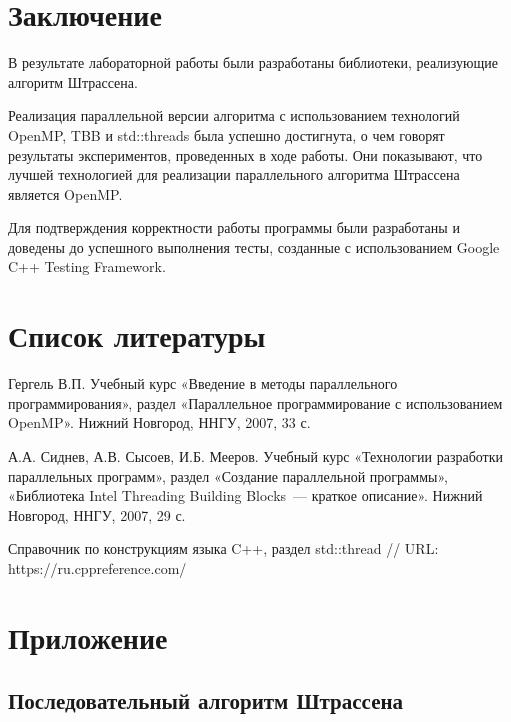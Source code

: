 \documentclass{article}
\begin{document}
\newpage

\section{Заключение}
В результате лабораторной работы были разработаны библиотеки, реализующие алгоритм Штрассена.

\par Реализация параллельной версии алгоритма с использованием технологий OpenMP, TBB и std::threads была успешно достигнута, о чем говорят результаты экспериментов, проведенных в ходе работы. Они показывают, что лучшей технологией для реализации параллельного алгоритма Штрассена является OpenMP.

\par Для подтверждения корректности работы программы были разработаны и доведены до успешного выполнения тесты, созданные с использованием Google C++ Testing Framework.

\newpage

\section{Список литературы}
\begin{enumerate}
 Гергель В.П. Учебный курс «Введение в методы параллельного программирования», раздел «Параллельное программирование с использованием OpenMP». Нижний Новгород, ННГУ, 2007, 33 с.

 А.А. Сиднев, А.В. Сысоев, И.Б. Мееров. Учебный курс «Технологии разработки параллельных программ», раздел «Создание параллельной программы», «Библиотека Intel Threading Building Blocks~--- краткое описание». Нижний Новгород, ННГУ, 2007, 29 с. 

 Справочник по конструкциям языка C++, раздел std::thread // URL: https://ru.cppreference.com/

\end{enumerate}

\newpage

\section{Приложение}
\subsection{Последовательный алгоритм Штрассена}




\end{document}
